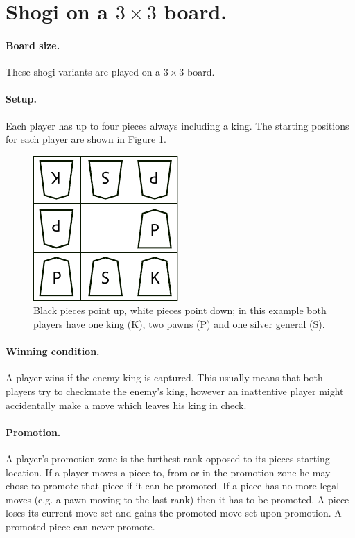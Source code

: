 \documentclass{article}
\begin{document}
{\appendix
\section{Shogi on a $3 \times 3$ board.}
\label{3x3rules}
\paragraph{Board size.} These shogi variants are played on a $3 \times 3$ board.

\paragraph{Setup.} Each player has up to four pieces always including a king. The starting positions for each player are shown in
Figure \ref{startingpos}.
\begin{figure}[h]
\center
\includegraphics{smallsetup.pdf}
\caption{Black pieces point up, white pieces point down; in this example both players have one king (K), two pawns (P) and one silver general (S).}
\label{startingpos}
\end{figure}

\paragraph{Winning condition.} A player wins if the enemy king is captured. This usually means that both players try to checkmate the enemy's king, however an
inattentive player might accidentally make a move which leaves his king in check.

\paragraph{Promotion.}  A player's promotion zone is the furthest rank opposed to its pieces starting location. 
If a player moves a piece to, from or in the promotion zone he may chose to promote that piece if it can be promoted. If a piece has no more legal moves
(e.g. a pawn moving to the last rank) then it has to be promoted. A piece loses its current move set and gains the promoted move set upon promotion. A promoted piece can never
promote.

}
\end{document}
